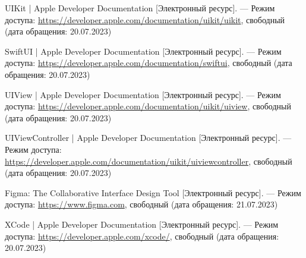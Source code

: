 \begin{thebibliography}{}

	UIKit | Apple Developer Documentation [Электронный ресурс]. --- Режим доступа: \url{https://developer.apple.com/documentation/uikit/uikit}, свободный (дата обращения: 20.07.2023)
	
	SwiftUI | Apple Developer Documentation [Электронный ресурс]. --- Режим доступа: \url{https://developer.apple.com/documentation/swiftui}, свободный (дата обращения: 20.07.2023)
	
	UIView | Apple Developer Documentation [Электронный ресурс]. --- Режим доступа: \url{https://developer.apple.com/documentation/uikit/uiview}, свободный (дата обращения: 20.07.2023)
	
	UIViewController | Apple Developer Documentation [Электронный ресурс]. --- Режим доступа: \url{https://developer.apple.com/documentation/uikit/uiviewcontroller}, свободный (дата обращения: 20.07.2023)
	
	Figma: The Collaborative Interface Design Tool  [Электронный ресурс]. --- Режим доступа: \url{https://www.figma.com}, свободный (дата обращения: 21.07.2023)
	
	XCode | Apple Developer Documentation [Электронный ресурс]. --- Режим доступа: \url{https://developer.apple.com/xcode/}, свободный (дата обращения: 20.07.2023)


\end{thebibliography}
